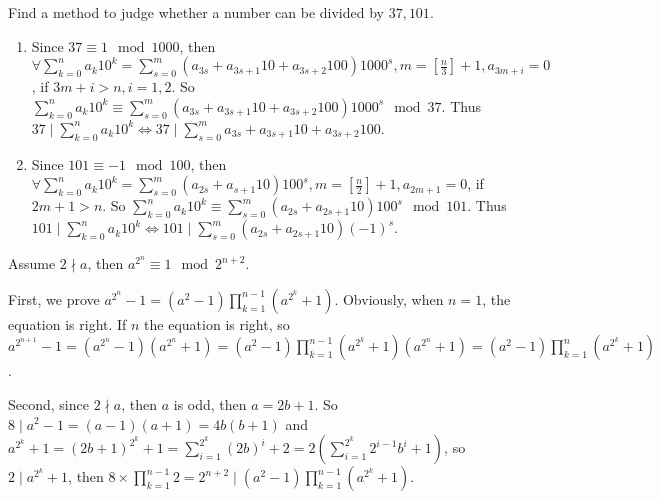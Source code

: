 \documentclass{ctexart}
\begin{document}
\begin{problem}\label{pro:p38.3}
  Find a method to judge whether a number can be divided by \(37,101\).
\end{problem}
\begin{solution}
  \begin{enumerate}
    \item Since \(37 \equiv 1 \mod 1000 \), then \(\forall \sum_{k=0}^n a_k 10^k=\sum_{s=0}^m (a_{3s} + a_{3s + 1}10 + a_{3s + 2}100)1000^s, m= [\frac{n}{3}] + 1, a_{3m + i}=0\), if \(3m + i >n,i=1,2\).
      So \(\sum_{k=0 }^n a_k 10^k \equiv \sum_{s=0}^m (a_{3s} + a_{3s + 1} 10+ a_{3s + 2}100)1000^s \mod 37\).
      Thus \(37 \mid \sum_{k=0}^n a_k 10^k \iff 37 \mid \sum_{s=0}^m a_{3s} + a_{3s + 1} 10+ a_{3s + 2}100\).
    \item Since \(101 \equiv -1 \mod 100 \), then \(\forall \sum_{k=0}^n a_k 10^k=\sum_{s=0}^m (a_{2s} + a_{s + 1}10 )100^s, m= [\frac{n}{2}] + 1, a_{2m + 1}=0\), if \(2m + 1 >n\).
      So \(\sum_{k=0 }^n a_k 10^k \equiv \sum_{s=0}^m (a_{2s} + a_{2s + 1} 10)100^s \mod 101\).
      Thus \(101 \mid \sum_{k=0}^n a_k 10^k \iff 101 \mid \sum_{s=0}^m (a_{2s} + a_{2s + 1} 10)(-1)^s\).
  \end{enumerate}

\end{solution}

\begin{problem}\label{pro:p38.5}
  Assume \(2 \nmid a\), then \(a^{2^n} \equiv 1 \mod 2^{n + 2}\).
\end{problem}
\begin{solution}
  First, we prove \(a^{2^n}-1=(a^2-1)\prod_{k=1}^{n-1}(a^{2^k} + 1)\).
  Obviously, when \(n=1\), the equation is right. If \(n\) the equation is right,
  so \(a^{2^{n + 1}}-1=(a^{2^n}-1)(a^{2^n} + 1)=(a^2 - 1)\prod_{k=1}^{n-1}(a^{2^k} + 1)(a^{2^n} + 1)= (a^2 - 1)\prod_{k=1}^{n}(a^{2^k} + 1)\).

  Second, since \(2 \nmid a\), then \(a \) is odd, then \(a= 2b + 1\). So \(8 \mid a^2 - 1= (a-1)(a + 1)=4b(b + 1)\) and
  \(a^{2^k} + 1=(2b + 1)^{2^k} + 1=\sum_{i=1}^{2^k} (2b)^i + 2=2(\sum_{i=1}^{2^k}2^{i-1}b^i + 1)\),
  so \(2 \mid a^{2^k} + 1\), then \(8 \times \prod_{k=1}^{n-1} 2=2^{n + 2} \mid (a^2 -1)\prod_{k=1}^{n -1}(a^{2^k} + 1) \).
\end{solution}
\end{document}
